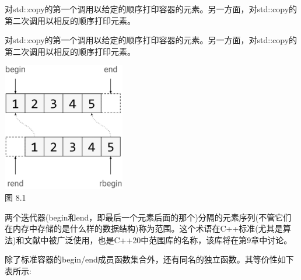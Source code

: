 对std::copy的第一个调用以给定的顺序打印容器的元素。另一方面，对std::copy的第二次调用以相反的顺序打印元素。

对std::copy的第一个调用以给定的顺序打印容器的元素。另一方面，对std::copy的第二次调用以相反的顺序打印元素。

\begin{center}
\includegraphics[width=0.4\textwidth]{images/1.png}\\
图 8.1
\end{center}

两个迭代器(begin和end，即最后一个元素后面的那个)分隔的元素序列(不管它们在内存中存储的是什么样的数据结构)称为范围。这个术语在C++标准(尤其是算法)和文献中被广泛使用，也是C++20中范围库的名称，该库将在第9章中讨论。

除了标准容器的begin/end成员函数集合外，还有同名的独立函数。其等价性如下表所示:

